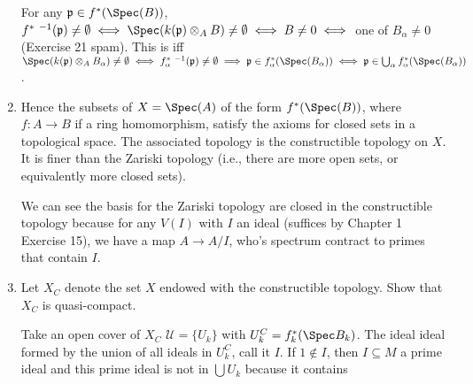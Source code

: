 \documentclass[a4paper]{exam}
\begin{document}
\begin{questions}
\begin{enumerate}
\begin{solution}
	For any $\mathfrak{p} \in f^\ast(\Spec(B)) $, $f^\ast\ ^{-1}(\mathfrak{p}) \ne \emptyset \iff \Spec(k(\mathfrak{p}) \otimes _A B) \ne \emptyset \iff B \ne 0 \iff $ one of $B_ \alpha \ne 0$ (Exercise 21 spam).
	This is iff $\Spec(k(\mathfrak{p}) \otimes _A B_ \alpha) \ne \emptyset \iff f_ \alpha^\ast\ ^{-1}(\mathfrak{p}) \ne \emptyset \implies \mathfrak{p} \in f_ \alpha^\ast(\Spec(B_ \alpha)) \iff \mathfrak{p} \in \bigcup_{\alpha} f_ \alpha^\ast(\Spec(B_ \alpha))$.
\end{solution}
\item Hence the subsets of $X = \Spec(A) $ of the form $f^\ast(\Spec(B)) $, where $f:A\to B $ if a ring homomorphism, satisfy the axioms for closed sets in a topological space. The associated topology is the constructible topology on $X $. It is finer than the Zariski topology (i.e., there are more open sets, or equivalently more closed sets).
\begin{solution}
	We can see the basis for the Zariski topology are closed in the constructible topology because for any $V(I) $ with $I $ an ideal (suffices by Chapter 1 Exercise 15), we have a map $A \to A / I $, who's spectrum contract to primes that contain $I $.
\end{solution}
\item Let $X_C $ denote the set $X $ endowed with the constructible topology. Show that $X_C $ is quasi-compact.
\begin{solution}
	Take an open cover of $X_C $ $\mathcal{U} = \{U_k\}$ with $U_k^C = f_k^\ast(\Spec B_k) $.
	The ideal ideal formed by the union of all ideals in $U_k^C $, call it $I $.
	If $1 \not\in I$, then $I\subseteq M $ a prime ideal and this prime ideal is not in $\bigcup U_k $ because it contains 
\end{solution}
\end{enumerate}


\end{questions}
\end{document}
